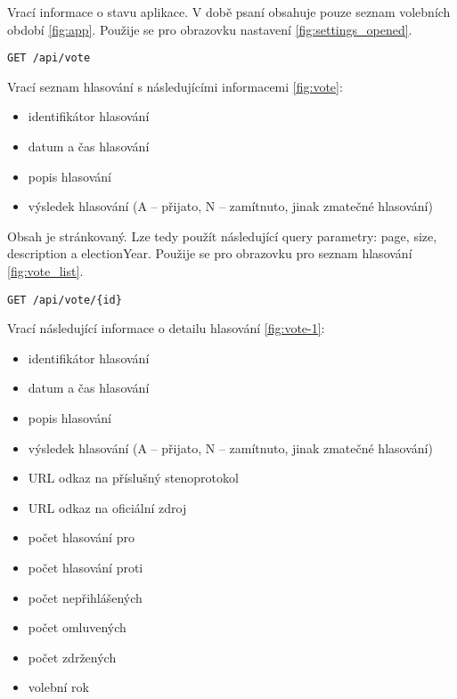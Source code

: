 \noindent Vrací informace o stavu aplikace. V době psaní obsahuje pouze seznam volebních období \ref{fig:app}. Použije se pro obrazovku nastavení \ref{fig:settings_opened}.

\vspace{10px}

\begin{lstlisting}[caption={HTTP dotaz pro seznam hlasování},label={lst:endpoint-votes}] 
GET /api/vote
\end{lstlisting}

\noindent Vrací seznam hlasování s následujícími informacemi \ref{fig:vote}:
\begin{itemize}
	\item identifikátor hlasování
	\item datum a čas hlasování
	\item popis hlasování
	\item výsledek hlasování (A -- přijato, N -- zamítnuto, jinak zmatečné hlasování)
\end{itemize}

\noindent Obsah je stránkovaný. Lze tedy použít následující query parametry: page, size, description a electionYear. Použije se pro obrazovku pro seznam hlasování \ref{fig:vote_list}.

\vspace{10px}

\begin{lstlisting}[caption={HTTP dotaz pro detail hlasování}, label={lst:endpoint-vote}] 
GET /api/vote/{id}
\end{lstlisting}

\noindent Vrací následující informace o detailu hlasování \ref{fig:vote-1}:
\begin{itemize}
	\item identifikátor hlasování
	\item datum a čas hlasování
	\item popis hlasování
	\item výsledek hlasování (A -- přijato, N -- zamítnuto, jinak zmatečné hlasování)
	\item URL odkaz na příslušný stenoprotokol
	\item URL odkaz na oficiální zdroj
	\item počet hlasování pro
	\item počet hlasování proti
	\item počet nepřihlášených
	\item počet omluvených
	\item počet zdržených
	\item volební rok
\end{itemize}

